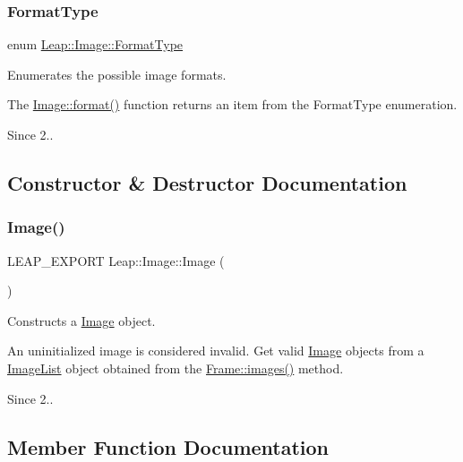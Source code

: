 \subsubsection{\texorpdfstring{Format\+Type}{FormatType}}
{\footnotesize\ttfamily enum \hyperlink{class_leap_1_1_image_acefbe5d3803afc9f433a6e3856d242d1}{Leap\+::\+Image\+::\+Format\+Type}}

Enumerates the possible image formats.

The \hyperlink{class_leap_1_1_image_a50d3952ed622312536c9f935987156c1}{Image\+::format()} function returns an item from the Format\+Type enumeration. \begin{DoxySince}{Since}
2.. 
\end{DoxySince}


\subsection{Constructor \& Destructor Documentation}
\mbox{\label{class_leap_1_1_image_a7d92772968c52fd77332d2390533d6e5}} 
\subsubsection{\texorpdfstring{Image()}{Image()}}
{\footnotesize\ttfamily L\+E\+A\+P\+\_\+\+E\+X\+P\+O\+RT Leap\+::\+Image\+::\+Image (\begin{DoxyParamCaption}{ }\end{DoxyParamCaption})}

Constructs a \hyperlink{class_leap_1_1_image}{Image} object.

An uninitialized image is considered invalid. Get valid \hyperlink{class_leap_1_1_image}{Image} objects from a \hyperlink{class_leap_1_1_image_list}{Image\+List} object obtained from the \hyperlink{class_leap_1_1_frame_a64839985307492bf124b72ea13b1f2cf}{Frame\+::images()} method.

\begin{DoxySince}{Since}
2.. 
\end{DoxySince}


\subsection{Member Function Documentation}
\mbox{\label{class_leap_1_1_image_aa4a51ac912a8f4676b8b60c3119f0dba}} 
